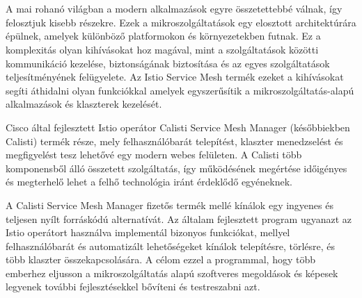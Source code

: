 \chapter{\bevezetes}

A mai rohanó világban a modern alkalmazások egyre összetettebbé válnak, így felosztjuk kisebb részekre.
Ezek a mikroszolgáltatások egy elosztott architektúrára épülnek, amelyek különböző platformokon és környezetekben futnak.
Ez a komplexitás olyan kihívásokat hoz magával, mint a szolgáltatások közötti kommunikáció kezelése, biztonságának biztosítása és az egyes szolgáltatások teljesítményének felügyelete.
Az Istio Service Mesh termék ezeket a kihívásokat segíti áthidalni olyan funkciókkal amelyek egyszerűsítik a mikroszolgáltatás-alapú alkalmazások és klaszterek kezelését.

Cisco által fejlesztett Istio operátor Calisti Service Mesh Manager (későbbiekben Calisti) termék része, mely felhasználóbarát telepítést, klaszter menedzselést és megfigyelést tesz lehetővé egy modern webes felületen. A Calisti több komponensből álló összetett szolgáltatás, így működésének megértése időigényes és megterhelő lehet a felhő technológia iránt érdeklődő egyéneknek.

A Calisti Service Mesh Manager fizetős termék mellé kínálok egy ingyenes és teljesen nyílt forráskódú alternatívát.
Az általam fejlesztett program ugyanazt az Istio operátort használva implementál bizonyos funkciókat, mellyel felhasználóbarát és automatizált lehetőségeket kínálok telepítésre, törlésre, és több klaszter összekapcsolására.
A célom ezzel a programmal, hogy több emberhez eljusson a mikroszolgáltatás alapú szoftveres megoldások és képesek legyenek további fejlesztésekkel bővíteni és testreszabni azt.

\newpage

